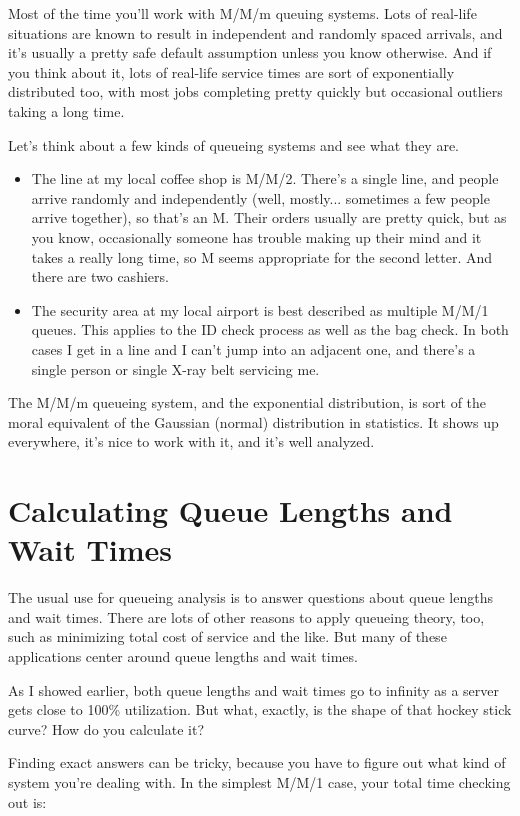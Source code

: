 \documentclass{vivid_layout_pdf}
\begin{document}
Most of the time you'll work with M/M/m queuing systems. Lots of real-life situations are known to result in independent and randomly spaced arrivals, and it's usually a pretty safe default assumption unless you know otherwise. And if you think about it, lots of real-life service times are sort of exponentially distributed too, with most jobs completing pretty quickly but occasional outliers taking a long time.

Let's think about a few kinds of queueing systems and see what they are.

\begin{itemize}
\item The line at my local coffee shop is M/M/2. There's a single line, and people arrive randomly and independently (well, mostly... sometimes a few people arrive together), so that's an M. Their orders usually are pretty quick, but as you know, occasionally someone has trouble making up their mind and it takes a really long time, so M seems appropriate for the second letter. And there are two cashiers.
\item The security area at my local airport is best described as multiple M/M/1 queues. This applies to the ID check process as well as the bag check. In both cases I get in a line and I can't jump into an adjacent one, and there's a single person or single X-ray belt servicing me.
\end{itemize}

The M/M/m queueing system, and the exponential distribution, is sort of the moral equivalent of the Gaussian (normal) distribution in statistics. It shows up everywhere, it's nice to work with it, and it's well analyzed.

\section{Calculating Queue Lengths and Wait Times}

The usual use for queueing analysis is to answer questions about queue lengths and wait times. There are lots of other reasons to apply queueing theory, too, such as minimizing total cost of service and the like. But many of these applications center around queue lengths and wait times.

As I showed earlier, both queue lengths and wait times go to infinity as a server gets close to 100\% utilization. But what, exactly, is the shape of that hockey stick curve? How do you calculate it?

Finding exact answers can be tricky, because you have to figure out what kind of system you're dealing with. In the simplest M/M/1 case, your total time checking out is:
\end{document}
